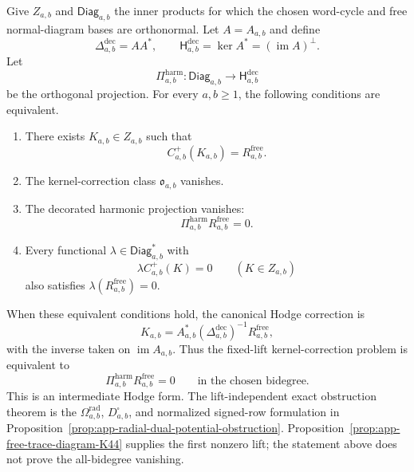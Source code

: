 \begin{stmt}
\label{stmt:app-free-kernel-homotopy-obstruction}
  Give \(Z_{a,b}\) and \(\mathsf{Diag}_{a,b}\) the inner products for
  which the chosen word-cycle and free normal-diagram bases are
  orthonormal.  Let \(A=A_{a,b}\) and define
  \[
    \Delta^{\mathrm{dec}}_{a,b}=AA^*,\qquad
    \mathsf H^{\mathrm{dec}}_{a,b}=\ker A^*
      =(\operatorname{im}A)^\perp .
  \]
  Let
  \[
    \Pi^{\mathrm{harm}}_{a,b}\colon
    \mathsf{Diag}_{a,b}\to\mathsf H^{\mathrm{dec}}_{a,b}
  \]
  be the orthogonal projection.  For every \(a,b\geq1\), the following
  conditions are equivalent.
  \begin{enumerate}
    \item There exists \(K_{a,b}\in Z_{a,b}\) such that
      \[
        C^+_{a,b}(K_{a,b})=R^{\mathrm{free}}_{a,b}.
      \]
    \item The kernel-correction class \(\mathfrak o_{a,b}\) vanishes.
    \item The decorated harmonic projection vanishes:
      \[
        \Pi^{\mathrm{harm}}_{a,b}R^{\mathrm{free}}_{a,b}=0.
      \]
    \item Every functional
      \(\lambda\in\mathsf{Diag}_{a,b}^{*}\) with
      \[
        \lambda C^+_{a,b}(K)=0\qquad(K\in Z_{a,b})
      \]
      also satisfies \(\lambda(R^{\mathrm{free}}_{a,b})=0\).
  \end{enumerate}
  When these equivalent conditions hold, the canonical Hodge correction is
  \[
    K_{a,b}=
    A_{a,b}^{*}(\Delta^{\mathrm{dec}}_{a,b})^{-1}
    R^{\mathrm{free}}_{a,b},
  \]
  with the inverse taken on \(\operatorname{im}A_{a,b}\).  Thus the
  fixed-lift kernel-correction problem is equivalent to
  \[
    \Pi^{\mathrm{harm}}_{a,b}R^{\mathrm{free}}_{a,b}=0
    \qquad\text{in the chosen bidegree.}
  \]
  This is an intermediate Hodge form.  The lift-independent exact
  obstruction theorem is the
  \(\Omega^{\mathrm{rad}}_{a,b}\), \(D^\square_{a,b}\), and normalized
  signed-row formulation in
  Proposition~\ref{prop:app-radial-dual-potential-obstruction}.
  Proposition~\ref{prop:app-free-trace-diagram-K44} supplies the first
  nonzero lift; the statement above does not prove the all-bidegree
  vanishing.
\end{stmt}

